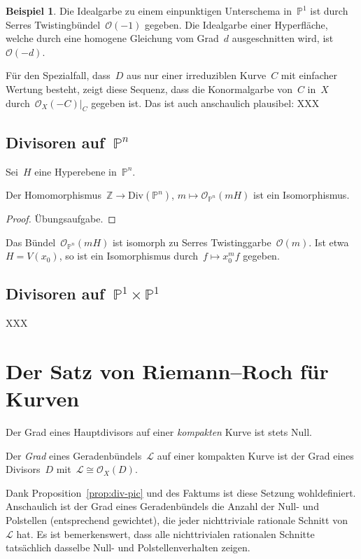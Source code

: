 \documentclass[a4paper,ngerman,12pt]{scrartcl}
\theoremstyle{definition}
\newtheorem{ex}[defn]{Beispiel}
\theoremstyle{plain}
\theoremstyle{remark}
\newcommand{\ZZ}{\mathbb{Z}}
\newcommand{\PP}{\mathbb{P}}
\renewcommand{\L}{\mathcal{L}}
\renewcommand{\O}{\mathcal{O}}
\newcommand{\Div}{\mathrm{Div}}
\begin{document}
\begin{ex}Die Idealgarbe zu einem einpunktigen Unterschema in~$\PP^1$ ist durch
Serres Twistingbündel~$\O(-1)$ gegeben. Die Idealgarbe einer Hyperfläche,
welche durch eine homogene Gleichung vom Grad~$d$ ausgeschnitten wird,
ist~$\O(-d)$.
\end{ex}

Für den Spezialfall, dass~$D$ aus nur einer irreduziblen Kurve~$C$ mit
einfacher Wertung besteht, zeigt diese Sequenz, dass die Konormalgarbe von~$C$
in~$X$ durch~$\O_X(-C)|_C$ gegeben ist. Das ist auch anschaulich plausibel: XXX


\subsection*{Divisoren auf~$\PP^n$}

Sei~$H$ eine Hyperebene in~$\PP^n$.

\begin{prop}Der Homomorphismus~$\ZZ \to \Div(\PP^n)$, $m \mapsto \O_{\PP^n}(mH)$ ist
ein Isomorphismus.\end{prop}
\begin{proof}Übungsaufgabe.\end{proof}

Das Bündel~$\O_{\PP^n}(mH)$ ist isomorph zu Serres Twistinggarbe~$\O(m)$. Ist etwa~$H =
V(x_0)$, so ist ein Isomorphismus durch~$f \mapsto x_0^m f$ gegeben.


\subsection*{Divisoren auf~$\PP^1 \times \PP^1$}

XXX


\section{Der Satz von Riemann--Roch für Kurven}

\begin{fact}Der Grad eines Hauptdivisors auf einer \emph{kompakten} Kurve ist
stets Null.\end{fact}

\begin{defn}Der \emph{Grad} eines Geradenbündels~$\L$ auf einer kompakten Kurve
ist der Grad eines Divisors~$D$ mit~$\L \cong \O_X(D)$.\end{defn}

Dank Proposition~\ref{prop:div-pic} und des Faktums ist diese Setzung
wohldefiniert. Anschaulich ist der Grad eines Geradenbündels die Anzahl der
Null- und Polstellen (entsprechend gewichtet), die jeder nichttriviale rationale
Schnitt von~$\L$ hat. Es ist bemerkenswert, dass alle nichttrivialen rationalen
Schnitte tatsächlich dasselbe Null- und Polstellenverhalten zeigen.
\end{document}
